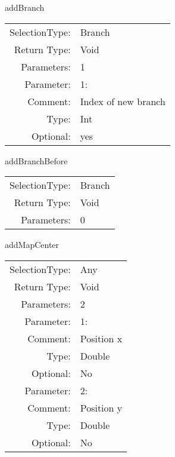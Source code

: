 \item addBranch\\
\begin{tabular}{rl}
  SelectionType: & Branch\\
    Return Type: & Void\\
     Parameters: & 1\\
   Parameter: &  1:\\
        Comment: & Index of new branch\\
           Type: & Int\\
       Optional: &  yes\\
\end{tabular}

\item addBranchBefore\\
\begin{tabular}{rl}
  SelectionType: & Branch\\
    Return Type: & Void\\
     Parameters: & 0\\
\end{tabular}

\item addMapCenter\\
\begin{tabular}{rl}
  SelectionType: & Any\\
    Return Type: & Void\\
     Parameters: & 2\\
   Parameter: &  1:\\
        Comment: & Position x\\
           Type: & Double\\
       Optional: &  No\\
   Parameter: &  2:\\
        Comment: & Position y\\
           Type: & Double\\
       Optional: &  No\\
\end{tabular}


